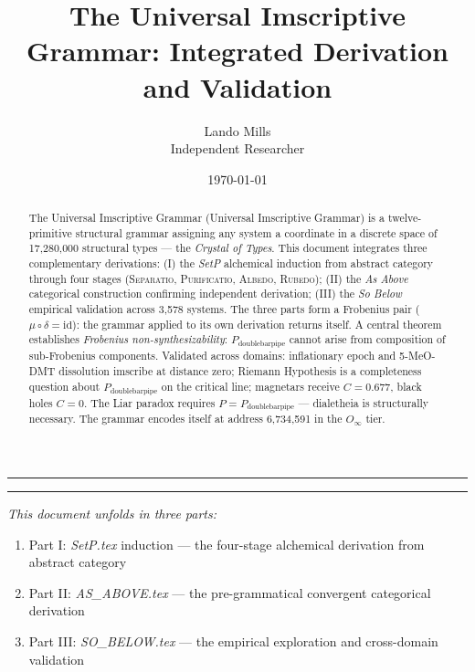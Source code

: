 \documentclass[12pt,a4paper]{article}
\newcommand{\UIG}{Universal Imscriptive Grammar}
\newcommand{\Separatio}{\textsc{Separatio}}
\newcommand{\Purificatio}{\textsc{Purificatio}}
\newcommand{\Albedo}{\textsc{Albedo}}
\newcommand{\Rubedo}{\textsc{Rubedo}}
\newcommand{\Ppms}{P_{\text{doublebarpipe}}}
\begin{document}
\title{The Universal Imscriptive Grammar: Integrated Derivation and Validation}
\author{Lando Mills \\ \normalsize Independent Researcher}
\date{\today}

\maketitle

\vspace{1em}
\begin{center}
\rule{0.5\textwidth}{0.4pt}
\end{center}

\begin{abstract}
The Universal Imscriptive Grammar (\UIG) is a twelve-primitive structural grammar assigning any system a coordinate in a discrete space of 17,280,000 structural types --- the \emph{Crystal of Types}. This document integrates three complementary derivations: (I) the \textit{SetP} alchemical induction from abstract category through four stages (\Separatio, \Purificatio, \Albedo, \Rubedo); (II) the \textit{As Above} categorical construction confirming independent derivation; (III) the \textit{So Below} empirical validation across 3,578 systems. The three parts form a Frobenius pair ($\mu \circ \delta = \text{id}$): the grammar applied to its own derivation returns itself. A central theorem establishes \emph{Frobenius non-synthesizability}: $\Ppms$ cannot arise from composition of sub-Frobenius components. Validated across domains: inflationary epoch and 5-MeO-DMT dissolution imscribe at distance zero; Riemann Hypothesis is a completeness question about $\Ppms$ on the critical line; magnetars receive $C = 0.677$, black holes $C = 0$. The Liar paradox requires $P = \Ppms$ --- dialetheia is structurally necessary. The grammar encodes itself at address 6,734,591 in the $O_\infty$ tier.
\end{abstract}

\begin{center}
\rule{0.5\textwidth}{0.4pt}
\end{center}

\emph{This document unfolds in three parts:}
\begin{enumerate}
    \item Part I: \textit{SetP.tex} induction --- the four-stage alchemical derivation from abstract category
    \item Part II: \textit{AS\_ABOVE.tex} --- the pre-grammatical convergent categorical derivation
    \item Part III: \textit{SO\_BELOW.tex} --- the empirical exploration and cross-domain validation
\end{enumerate}
\end{document}
